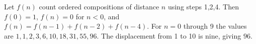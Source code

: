 Let $f(n)$ count ordered compositions of distance $n$ using steps 1,2,4. Then $f(0)=1$, $f(n)=0$ for $n<0$, and $f(n)=f(n-1)+f(n-2)+f(n-4)$. For $n=0$ through 9 the values are $1,1,2,3,6,10,18,31,55,96$. The displacement from 1 to 10 is nine, giving $\boxed{96}$.
